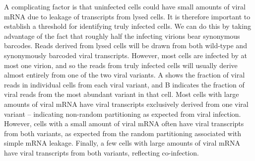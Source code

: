 \documentclass[9pt,lineno]{elife}
\providecommand{\DIFadd}[1]{{\protect\color{blue}\uwave{#1}}} %
\providecommand{\DIFaddbegin}{} %
\providecommand{\DIFaddend}{} %
\begin{document}
A complicating factor is that uninfected cells could have small amounts of viral mRNA due to leakage of transcripts from lysed cells.
It is therefore important to establish a threshold for identifying truly infected cells.
We can do this by taking advantage of the fact that roughly half the infecting virions bear synonymous barcodes.
Reads derived from lysed cells will be drawn from both wild-type and synonymously barcoded viral transcripts.
However, most cells are infected by at most one virion, and so the reads from truly infected cells will usually derive almost entirely from one of the two viral variants. 
A shows the fraction of viral reads in individual cells from each viral variant, and B indicates the fraction of viral reads from the most abundant variant in that cell.
Most cells with large amounts of viral mRNA have viral transcripts exclusively derived from one viral variant -- indicating non-random partitioning as expected from viral infection.
However, cells with a small amount of viral mRNA often have viral transcripts from both variants, as expected from the random partitioning associated with simple mRNA leakage.
Finally, a few cells with large amounts of viral mRNA have viral transcripts from both variants, \DIFaddbegin \DIFadd{likely }\DIFaddend reflecting co-infection.
\end{document}
